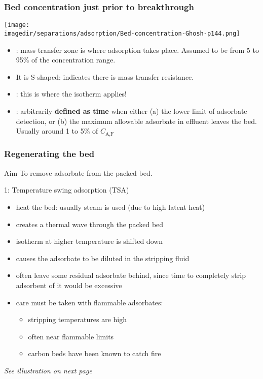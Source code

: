 \begin{frame}\frametitle{Bed concentration just prior to breakthrough}
	\begin{center}
		\texttt{[image: \\imagedir/separations/adsorption/Bed-concentration-Ghosh-p144.png]}
	\end{center}
	\vspace{-12pt}
	\vspace{6pt}
	{\small
		\begin{itemize}
			\item	{\color{purple}{MTZ}}: mass transfer zone is where adsorption takes place. Assumed to be from 5 to 95\% of the concentration range.
			\item	It is S-shaped: indicates there is mass-transfer resistance.
			\item	{\color{purple}{Equilibrium zone}}: this is where the isotherm applies!
			\item	{\color{purple}{Breakthrough}}: arbitrarily \textbf{defined as time} when either (a)  the lower limit of adsorbate detection, or (b) the maximum allowable adsorbate in effluent leaves the bed. Usually around 1 to 5\% of $C_\text{A,F}$
		\end{itemize}	
	}
\end{frame}

\begin{frame}\frametitle{Regenerating the bed}
	\begin{exampleblock}{Aim}
		To remove adsorbate from the packed bed.
	\end{exampleblock}
	
	1: Temperature swing adsorption (TSA)
	\begin{itemize}
		\item	heat the bed: usually steam is used (due to high latent heat)
		\item	creates a thermal wave through the packed bed
		\item	isotherm at higher temperature is shifted down
		\item	causes the adsorbate to be diluted in the stripping fluid
		\item	often leave some residual adsorbate behind, since time to completely strip adsorbent of it would be excessive
		\item	care must be taken with flammable adsorbates:
		\begin{itemize}
			\item	stripping temperatures are high
			\item	often near flammable limits
			\item	carbon beds have been known to catch fire
		\end{itemize}
	\end{itemize}
	\emph{See illustration on next page}
\end{frame}

